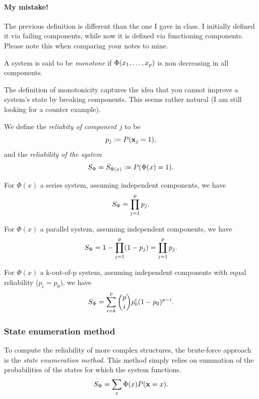 \begin{tcolorbox}
\paragraph{My mistake!}
The previous definition is different than the one I gave in class. 
I initially defined it via failing components, while now it is defined via functioning components.
Please note this when comparing your notes to mine.
\end{tcolorbox}




\begin{definition}
A system is said to be \emph{monotone} if $\Phi(x_1,\dots,x_p)$ is non decreasing in all components.
\end{definition}
The definition of monotonicity captures the idea that you cannot improve a system's state by breaking components.
This seems rather natural (I am still looking for a counter example).






\begin{definition}[Reliability]
We define the \emph{reliabity of component $j$} to be $$p_j:= P(\mathbf{x}_j=1),$$ 
and  the \emph{reliability of the system} 
$$ S_\Phi = S_{\Phi(x)}:=P(\Phi(x)=1).$$
\end{definition}


\begin{example}
For $\Phi(x)$ a series system, assuming independent components, we have
$$ S_\Phi= \prod_{j=1}^{p} p_j.$$
\end{example}


\begin{example}
For $\Phi(x)$ a parallel system, assuming independent components, we have
$$ S_\Phi= 1-\prod_{j=1}^{p} (1-p_j)= \coprod_{j=1}^p p_j. $$
\end{example}


\begin{example}
For $\Phi(x)$ a k-out-of-p system, assuming independent components with equal reliability ($p_i=p_0$), we have
$$ S_\Phi= \sum_{i=k}^{p} \binom{p}{i} p_0^i (1-p_0)^{p-i} .$$
\end{example}



\subsubsection{State enumeration method}
To compute the reliability of more complex structures, the brute-force approach is the \emph{state enumeration method}. 
This method simply relies on summation of the probabilities of the states for which the system functions.
$$ S_\Phi= \sum_{x} \Phi(x) P(\mathbf{x}=x).$$


